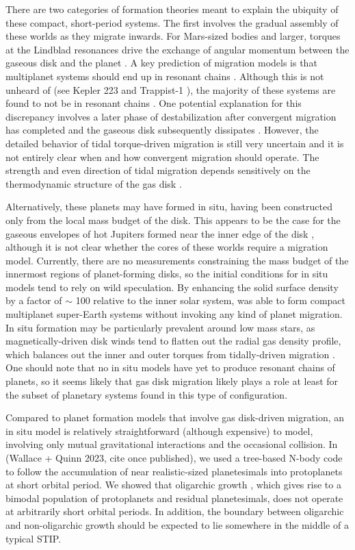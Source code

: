 There are two categories of formation theories meant to explain the ubiquity of these compact, short-period systems. The first 
involves the gradual assembly of these worlds as they migrate inwards. For Mars-sized bodies and larger, torques at the Lindblad 
resonances drive the exchange of angular momentum between the gaseous disk and the planet \cite{ward97}. A key prediction of 
migration models is that multiplanet systems should end up in resonant chains \cite{cresswell06}. Although this is not unheard of 
(see Kepler 223 \cite{mills16} and Trappist-1 \cite{gillon16, gillon17, agol21}), the majority of these systems are found to not be in 
resonant chains \cite{lissauer11, fabrycky14}. One potential explanation for this discrepancy involves a later phase of 
destabilization after convergent migration has completed and the gaseous disk subsequently dissipates 
\cite{izidoro17, izidoro21}. However, the detailed behavior of tidal torque-driven migration is still very uncertain and it is not 
entirely clear when and how convergent migration should operate. The strength and even direction of tidal migration depends 
sensitively on the thermodynamic structure of the gas disk \cite{ayliffe10, bitsch13}.

Alternatively, these planets may have formed in situ, having been constructed only from the local mass budget of the disk. This 
appears to be the case for the gaseous envelopes of hot Jupiters formed near the inner edge of the disk \cite{bailey18}, although 
it is not clear whether the cores of these worlds require a migration model. Currently, there are no measurements constraining the 
mass budget of the innermost regions of planet-forming disks, so the initial conditions for in situ models tend to rely on wild 
speculation. By enhancing the solid surface density by a factor of $\sim$ 100 relative to the inner solar system, \cite{hansen12} 
was able to form compact multiplanet super-Earth systems without invoking any kind of planet migration. In situ formation may be 
particularly prevalent around low mass stars, as magnetically-driven disk winds tend to flatten out the radial gas density profile, 
which balances out the inner and outer torques from tidally-driven migration \cite{ogihara18}. One should note that no in situ 
models have yet to produce resonant chains of planets, so it seems likely that gas disk migration likely plays a role at least for the 
subset of planetary systems found in this type of configuration.

Compared to planet formation models that involve gas disk-driven migration, an in situ model is relatively straightforward 
(although expensive) to model, involving only mutual gravitational interactions and the occasional collision. In (Wallace + Quinn 
2023, cite once published), we used a tree-based N-body code to follow the accumulation of near realistic-sized planetesimals 
into protoplanets at short orbital period. We showed that oligarchic growth \cite{kokubo98}, which gives rise to a bimodal 
population of protoplanets and residual planetesimals, does not operate at arbitrarily short orbital periods. In addition, the 
boundary between oligarchic and non-oligarchic growth should be expected to lie somewhere in the middle of a typical STIP.

